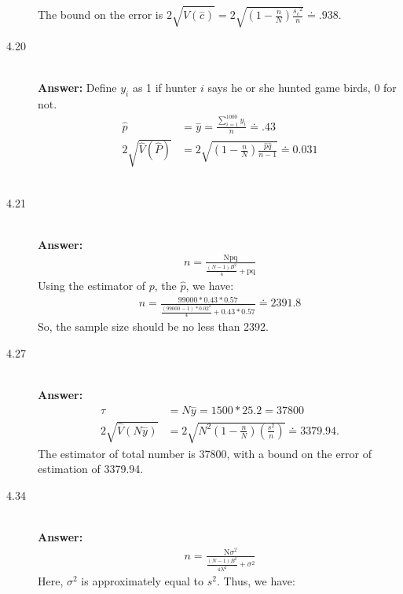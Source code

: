 \documentclass{article}
\begin{document}
\begin{description}
            The bound on the error is $2\sqrt{\hat{V}\left(\overset{-}{c}\right)}=2\sqrt{\left(1-\frac{n}{N}\right)\frac{s_c{}^2}{n}}\doteq .938$.\\
    \item[4.20 ] \hfill \\
        {\bf Answer:} Define $y_i$ as 1 if hunter $i$ says he or she hunted game birds, 0 for not.\\
            \begin{align}
            \hat{p}&=\overset{-}{y}=\frac{\sum _{i=1}^{1000} y_i}{n}\doteq .43\\
            2\sqrt{\hat{V}\left(\hat{P}\right)}&=2\sqrt{\left(1-\frac{n}{N}\right)\frac{\hat{p}\hat{q}}{n-1}}\doteq 0.031
            \end{align}\\
    \item[4.21 ] \hfill \\
        {\bf Answer:}\\
        \begin{align}
        n=\frac{\text{Npq}}{\frac{(N-1)B^2}{4}+\text{pq}}
        \end{align}
        Using the estimator of $p$, the $\hat{p}$, we have:\\
        \begin{align}
        n=\frac{99000*0.43*0.57}{\frac{(99000-1)*0.02^2}{4}+0.43*0.57}\doteq 2391.8
        \end{align}
        So, the sample size should be no less than 2392.\\
    \item[4.27 ] \hfill \\
    {\bf Answer:}\\
        \begin{align}
        \tau &=N\overset{-}{y}=1500*25.2=37800\\
        2\sqrt{\hat{V}\left(N\overset{-}{y}\right)}&=2\sqrt{N^2\left(1-\frac{n}{N}\right)\left(\frac{s^2}{n}\right)}\doteq 3379.94.
        \end{align}
        The estimator of total number is 37800, with a bound on the error of estimation of 3379.94.
    \item[4.34 ] \hfill \\
    {\bf Answer:}\\
        \begin{align}
        n=\frac{\text{N$\sigma $}^2}{\frac{(N-1)B^2}{4N^2}+\sigma ^2}
        \end{align}
        Here, ${\sigma}^2$ is approximately equal to $s^2$. Thus, we have:\\

\end{description}
\end{document}
